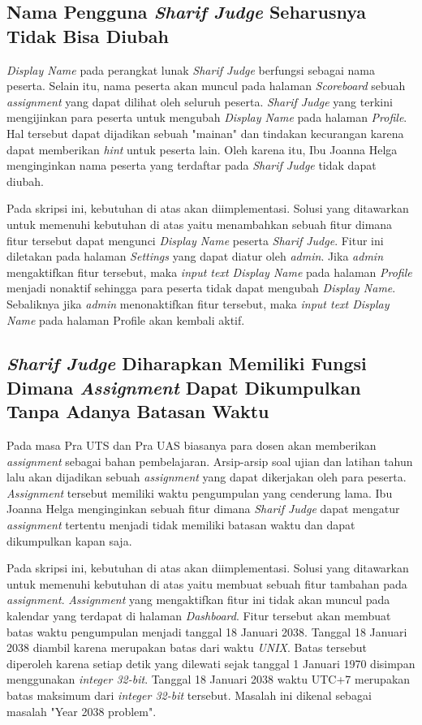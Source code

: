 \subsection{Nama Pengguna \textit{Sharif Judge} Seharusnya Tidak Bisa Diubah}
\textit{Display Name} pada perangkat lunak \textit{Sharif Judge} berfungsi sebagai nama peserta. Selain itu, nama peserta akan muncul pada halaman \textit{Scoreboard} sebuah \textit{assignment} yang dapat dilihat oleh seluruh peserta. \textit{Sharif Judge} yang terkini mengijinkan para peserta untuk mengubah \textit{Display Name} pada halaman \textit{Profile}. Hal tersebut dapat dijadikan sebuah "mainan" dan tindakan kecurangan karena dapat memberikan \textit{hint} untuk peserta lain. Oleh karena itu, Ibu Joanna Helga menginginkan nama peserta yang terdaftar pada \textit{Sharif Judge} tidak dapat diubah. 

Pada skripsi ini, kebutuhan di atas akan diimplementasi. Solusi yang ditawarkan untuk memenuhi kebutuhan di atas yaitu menambahkan sebuah fitur dimana fitur tersebut dapat mengunci \textit{Display Name} peserta \textit{Sharif Judge}. Fitur ini diletakan pada halaman \textit{Settings} yang dapat diatur oleh \textit{admin}. Jika \textit{admin} mengaktifkan fitur tersebut, maka \textit{input text Display Name} pada halaman \textit{Profile} menjadi nonaktif sehingga para peserta tidak dapat mengubah \textit{Display Name}. Sebaliknya jika \textit{admin} menonaktifkan fitur tersebut, maka \textit{input text Display Name} pada halaman Profile akan kembali aktif.

\subsection{\textit{Sharif Judge} Diharapkan Memiliki Fungsi Dimana \textit{Assignment} Dapat Dikumpulkan Tanpa Adanya Batasan Waktu}
Pada masa Pra UTS dan Pra UAS biasanya para dosen akan memberikan \textit{assignment} sebagai bahan pembelajaran. Arsip-arsip soal ujian dan latihan tahun lalu akan dijadikan sebuah \textit{assignment} yang dapat dikerjakan oleh para peserta. \textit{Assignment} tersebut memiliki waktu pengumpulan yang cenderung lama. Ibu Joanna Helga menginginkan sebuah fitur dimana \textit{Sharif Judge} dapat mengatur \textit{assignment} tertentu menjadi tidak memiliki batasan waktu dan dapat dikumpulkan kapan saja. 

Pada skripsi ini, kebutuhan di atas akan diimplementasi. Solusi yang ditawarkan untuk memenuhi kebutuhan di atas yaitu membuat sebuah fitur tambahan pada \textit{assignment}. \textit{Assignment} yang mengaktifkan fitur ini tidak akan muncul pada kalendar yang terdapat di halaman \textit{Dashboard}. Fitur tersebut akan membuat batas waktu pengumpulan menjadi tanggal 18 Januari 2038. Tanggal 18 Januari 2038 diambil karena merupakan batas dari waktu \textit{UNIX}. Batas tersebut diperoleh karena setiap detik yang dilewati sejak tanggal 1 Januari 1970 disimpan menggunakan \textit{integer 32-bit}. Tanggal 18 Januari 2038 waktu UTC+7 merupakan batas maksimum dari \textit{integer 32-bit} tersebut. Masalah ini dikenal sebagai masalah "Year 2038 problem". 

